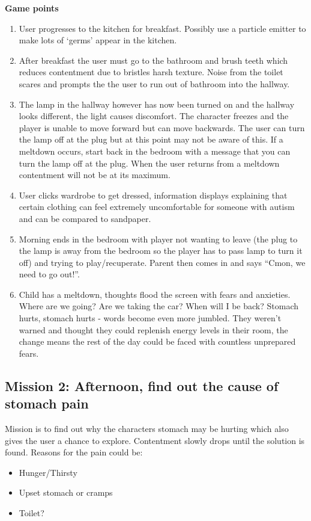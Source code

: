 \documentclass[11pt]{report}
\begin{document}
\textbf{Game points}
\begin{enumerate}
\item User progresses to the kitchen for breakfast. Possibly use a particle emitter to make lots of ‘germs’ appear in the kitchen.
\item After breakfast the user must go to the bathroom and brush teeth which reduces contentment due to bristles harsh texture. Noise from the toilet scares and prompts the the user to run out of bathroom into the hallway.
\item The lamp in the hallway however has now been turned on and the hallway looks different, the light causes discomfort. The character freezes and the player is unable to move forward but can move backwards. The user can turn the lamp off at the plug but at this point may not be aware of this. If a meltdown occurs, start back in the bedroom with a message that you can turn the lamp off at the plug. When the user returns from a meltdown contentment will not be at its maximum.
\item User clicks wardrobe to get dressed, information displays explaining that certain clothing can feel extremely uncomfortable for someone with autism and can be compared to sandpaper.
\item Morning ends in the bedroom with player not wanting to leave (the plug to the lamp is away from the bedroom so the player has to pass lamp to turn it off) and trying to play/recuperate. Parent then comes in and says “Cmon, we need to go out!”.
\item Child has a meltdown, thoughts flood the screen with fears and anxieties. Where are we going? Are we taking the car? When will I be back? Stomach hurts, stomach hurts - words become even more jumbled. They weren't warned and thought they could replenish energy levels in their room, the change means the rest of the day could be faced with countless unprepared fears.
\end{enumerate}

\subsection*{Mission 2: Afternoon, find out the cause of stomach pain}
Mission is to find out why the characters stomach may be hurting which also gives the user a chance to explore. Contentment slowly drops until the solution is found. Reasons for the pain could be:

\begin{itemize}
\item Hunger/Thirsty
\item Upset stomach or cramps
\item Toilet?
\end{itemize}
\end{document}
